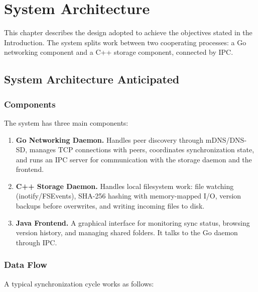 \chapter{System Architecture}

This chapter describes the design adopted to achieve the objectives stated in the Introduction. The system splits work between two cooperating processes: a Go networking component and a C++ storage component, connected by IPC.

\section{System Architecture Anticipated}
\label{sec:arch-anticipated}

\subsection{Components}

The system has three main components:

\begin{enumerate}
    \item \textbf{Go Networking Daemon.} Handles peer discovery through mDNS/DNS-SD, manages TCP connections with peers, coordinates synchronization state, and runs an IPC server for communication with the storage daemon and the frontend.

    \item \textbf{C++ Storage Daemon.} Handles local filesystem work: file watching (inotify/FSEvents), SHA-256 hashing with memory-mapped I/O, version backups before overwrites, and writing incoming files to disk.

    \item \textbf{Java Frontend.} A graphical interface for monitoring sync status, browsing version history, and managing shared folders. It talks to the Go daemon through IPC.
\end{enumerate}

\subsection{Data Flow}

A typical synchronization cycle works as follows:

